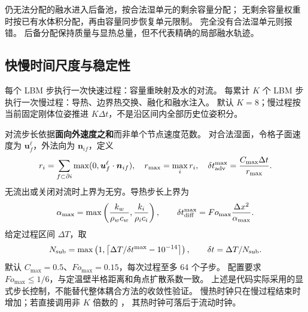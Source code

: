 仍无法分配的融水进入后备池，按合法湿单元的剩余容量分配；
无剩余容量权重时按已有水体积分配，再由容量同步恢复单元限制。
完全没有合法湿单元则报错。
后备分配保持质量与显热总量，但不代表精确的局部融水轨迹。


\subsection{快慢时间尺度与稳定性}
\label{sec:multirate}
每个 LBM 步执行一次快速过程：容量重映射及水的对流。
每累计 $K$ 个 LBM 步执行一次慢过程：导热、边界热交换、融化和融水注入。
默认 $K=8$；慢过程按当前固定刚体位姿推进 $K\Delta t$，不是沿区间内全部历史位姿积分。

对流步长依据\textbf{面向外速度之和}而非单个节点速度范数。
对合法湿面，令格子面速度为 $\bm u_f^\ell$，外法向为 $\bm n_{if}$，定义
\begin{equation}
 r_i=\sum_{f\subset\partial i}\max(0,\bm u_f^\ell\cdot\bm n_{if}),
 \quad r_{\max}=\max_i r_i,
 \quad \delta t_{\rm adv}^{\max}=\frac{C_{\max}\Delta t}{r_{\max}}.
\end{equation}
无流出或关闭对流时上界为无穷。导热步长上界为
\begin{equation}
 \alpha_{\max}=\max\left(\frac{k_w}{\rho_wc_w},\frac{k_i}{\rho_ic_i}\right),
 \qquad \delta t_{\rm diff}^{\max}=Fo_{\max}\frac{\Delta x^2}{\alpha_{\max}}.
\end{equation}
给定过程区间 $\Delta T$，取
\begin{equation}
 N_{\rm sub}=\max\left(1,\left\lceil\Delta T/\delta t^{\max}-10^{-14}\right\rceil\right),
 \qquad \delta t=\Delta T/N_{\rm sub}.
\end{equation}
默认 $C_{\max}=0.5$、$Fo_{\max}=0.15$，每次过程至多 64 个子步。
配置要求 $Fo_{\max}\leq1/6$，与定温壁半格距离和角点扩散系数一致。
上述是代码实际采用的显式步长控制，不能替代整体耦合方法的收敛性验证。
慢热时钟只在慢过程结束时增加；若直接调用非 $K$ 倍数的 ，
其热时钟可落后于流动时钟。
